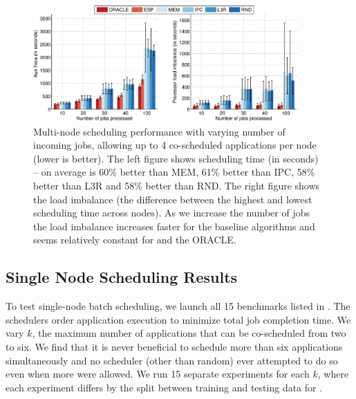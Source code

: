 \begin{figure}[!t]
\begin{center}
 \includegraphics[width=0.9\textwidth]{figures/parallel_schedule_combb_100jobs_load_4_4_load_imbalance_combinedCOPY.pdf}
 \caption{\small Multi-node scheduling performance with varying number
   of incoming jobs, allowing up to 4 co-scheduled applications per
   node (lower is better). The left figure shows scheduling time (in
   seconds) -- on average \SYSTEM{} is 60\% better than MEM, 61\%
   better than IPC, 58\% better than L3R and 58\% better than RND. The
   right figure shows the load imbalance (the difference between the
   highest and lowest scheduling time across nodes).  As we increase
   the number of jobs the load imbalance increases faster for the
   baseline algorithms and seems relatively constant for \SYSTEM{} and
   the ORACLE.}
\label{fig:expt:multi-node-100}
\end{center}
\end{figure}

\subsection{Single Node Scheduling Results}
\label{sec:sched_single_proc}
To test single-node batch scheduling, we launch all 15 benchmarks
listed in .  The schedulers order application execution
to minimize total job completion time.  We vary $k$, the maximum
number of applications that can be co-scheduled from two to six.  We
find that it is never beneficial to schedule more than six
applications simultaneously and no scheduler (other than random) ever
attempted to do so even when more were allowed.  We run 15 separate
experiments for each $k$, where each experiment differs by the split
between training and testing data for \SYSTEM{}.


